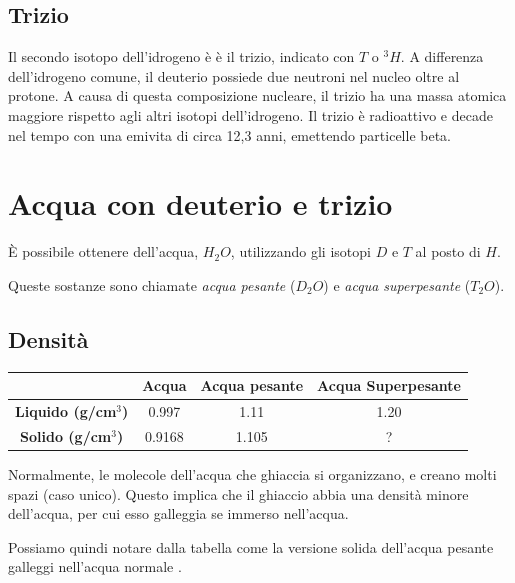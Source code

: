 \documentclass[a4paper]{article}
\begin{document}
\subsection{Trizio}

Il secondo isotopo dell'idrogeno è è il trizio, indicato con \(T\) o \(^3H\).
A differenza dell'idrogeno comune, il deuterio possiede due neutroni nel nucleo oltre al protone.
A causa di questa composizione nucleare, il trizio ha una massa atomica maggiore rispetto agli altri isotopi dell'idrogeno.
Il trizio è radioattivo e decade nel tempo con una emivita di circa 12,3 anni, emettendo particelle beta.

\section{Acqua con deuterio e trizio}

È possibile ottenere dell'acqua, \(H_2O\), utilizzando gli isotopi \(D\) e \(T\) al posto di \(H\).

Queste sostanze sono chiamate \textit{acqua pesante} (\(D_2O\)) e
\textit{acqua superpesante} (\(T_2O\)).

\subsection{Densità}

\begin{center}
    \bgroup{}
    \def\arraystretch{1.25}
    \begin{tabular}{ |c|c|c|c| }
        \hline
        & \textbf{Acqua} & \textbf{Acqua pesante} & \textbf{Acqua Superpesante} \\
        \hline
        \textbf{Liquido (g/cm\(^3\))} & 0.997 & 1.11 & 1.20 \\
        \hline
        \textbf{Solido (g/cm\(^3\))} & 0.9168 & 1.105 & ? \\
        \hline
    \end{tabular}
    \egroup{}
\end{center}

Normalmente, le molecole dell'acqua che ghiaccia si organizzano, e creano molti spazi (caso unico).
Questo implica che il ghiaccio abbia una densità minore dell'acqua, per cui esso galleggia se immerso nell'acqua.

Possiamo quindi notare dalla tabella come la versione solida dell'acqua pesante galleggi
nell'acqua normale \cite{deuterated-water}.

\nocite{*} %

\printbibliography
\end{document}
